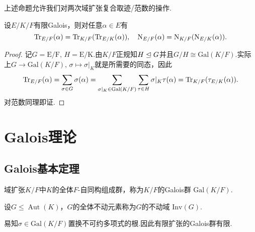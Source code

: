 上述命题允许我们对两次域扩张复合取迹/范数的操作.
\begin{prop}[(传递公式)]
    设$E/K/F$有限Galois，则对任意$\alpha\in E$有
    \[
        \operatorname{Tr}_{E/F}(\alpha)=\operatorname{Tr}_{K/F}(\operatorname{Tr}_{E/K}(\alpha)),\quad\operatorname{N}_{E/F}(\alpha)=\operatorname{N}_{K/F}(\operatorname{N}_{E/K}(\alpha)).
    \]
\end{prop}
\begin{proof}
    记$G=\mathrm{E/F},\,H=\mathrm{E/K}$.由$K/F$正规知$H\trianglelefteq G$并且$G/H\cong\mathrm{Gal}(K/F)$.实际上$G\to\mathrm{Gal}(K/F),\,\sigma\mapsto\sigma|_K$就是所需要的同态，因此
    \[
        \operatorname{Tr}_{E/F}(\alpha)=\sum_{\sigma\in G}\sigma(\alpha)=\sum_{\sigma|_K\in\mathrm{Gal}(K/F)}\sum_{\tau\in H}\sigma|_K\tau(\alpha)=\operatorname{Tr}_{K/F}(\tau_{E/K}(\alpha)).
    \]
    对范数同理即证.
\end{proof}
\newpage

\section{Galois理论}
\subsection{Galois基本定理}
\begin{definition}
    域扩张$K/F$中$K$的全体$F$-自同构组成群，称为$K/F$的{\heiti Galois群} $\mathrm{Gal}(K/F)$.

    设$G\le\operatorname*{Aut}(K)$，$G$的全体不动元素称为$G$的{\heiti 不动域} $\mathrm{Inv}(G)$.
\end{definition}

易知$\sigma\in\mathrm{Gal}(K/F)$置换不可约多项式的根.因此有限扩张的Galois群有限.

